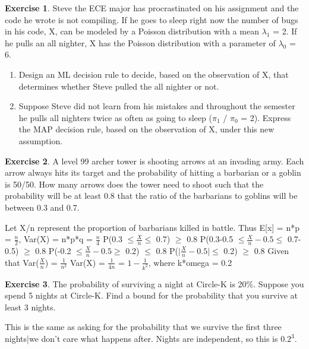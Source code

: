 \documentclass[12pt]{amsart}
\theoremstyle{definition}
\newtheorem{exercise}{Exercise}
\numberwithin{equation}{section}
\theoremstyle{plain}
\begin{document}
 

\begin{exercise}
Steve the ECE major has procrastinated on his assignment and the code he wrote is not compiling. If he goes to sleep right now the number of bugs in his code, X, can be modeled by a Poisson distribution with a mean $\lambda_1$ = 2. If he pulls an all nighter, X has the Poisson distribution with a parameter of $\lambda_0$ = 6. 
\begin{enumerate}
    \item Design an ML decision rule to decide, based on the observation of X, that determines whether Steve pulled the all nighter or not.
    \item Suppose Steve did not learn from his mistakes and throughout the semester he pulls all nighters twice as often as going to sleep ($\pi_1$ / $\pi_0$ = 2). Express the MAP decision rule, based on the observation of X, under this new assumption. 
\end{enumerate}

\end{exercise}

 

\begin{exercise}
A level 99 archer tower is shooting arrows at an invading army. Each arrow always hits its target and the probability of hitting a barbarian or a goblin is 50/50. How many arrows does the tower need to shoot such that the probability will be at least 0.8 that the ratio of the barbarians to goblins will be between 0.3 and 0.7.
\begin{answer}
Let X/n represent the proportion of barbarians killed in battle. Thus E[x] = n*p = $\frac{n}{2}$, Var(X) = n*p*q = $\frac{n}{4}$
\newline
P(0.3 $\leq \frac{X}{n} \leq$ 0.7) $\geq$ 0.8
\newline
P(0.3-0.5 $\leq \frac{X}{n}-0.5 \leq$ 0.7-0.5) $\geq$ 0.8
\newline
P(-0.2 $\leq \frac{X}{n}-0.5 \geq$ 0.2) $\leq$ 0.8
\newline
P($\mid \frac{X}{n}-0.5\mid \leq$ 0.2) $\geq$ 0.8
\newline
Given that Var($\frac{X}{n}$) = $\frac{1}{n^2}$ Var(X) = $\frac{1}{4n}$
 = $1-\frac{1}{k^2}$, where k*omega = 0.2
\end{answer}
\end{exercise}

 

\begin{exercise}
The probability of surviving a night at Circle-K is 20\%. Suppose you spend 5 nights at Circle-K. Find a bound for the probability that you survive at least 3 nights.
\begin{answer}
    This is the same as asking for the probability that we survive the first three nights|we don't care what happens after. Nights are independent, so this is $0.2^3$.
\end{answer}
\end{exercise}
\end{document}
